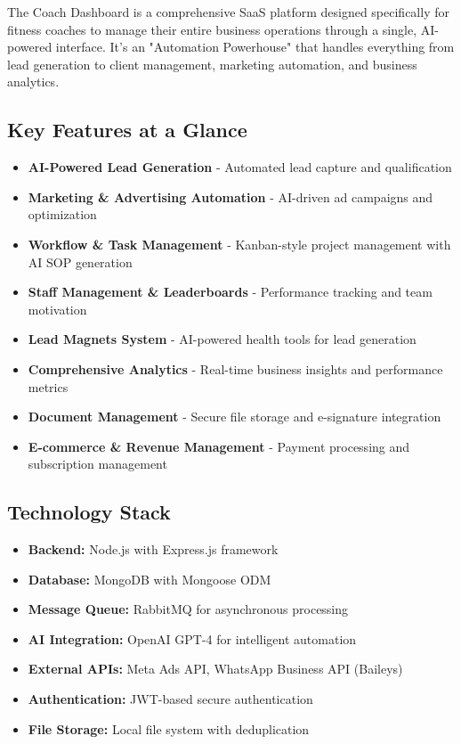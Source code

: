 \documentclass[12pt,a4paper]{article}
\begin{document}
The Coach Dashboard is a comprehensive SaaS platform designed specifically for fitness coaches to manage their entire business operations through a single, AI-powered interface. It's an "Automation Powerhouse" that handles everything from lead generation to client management, marketing automation, and business analytics.

\subsection{Key Features at a Glance}

\begin{itemize}
    \item \textbf{AI-Powered Lead Generation} - Automated lead capture and qualification
    \item \textbf{Marketing \& Advertising Automation} - AI-driven ad campaigns and optimization
    \item \textbf{Workflow \& Task Management} - Kanban-style project management with AI SOP generation
    \item \textbf{Staff Management \& Leaderboards} - Performance tracking and team motivation
    \item \textbf{Lead Magnets System} - AI-powered health tools for lead generation
    \item \textbf{Comprehensive Analytics} - Real-time business insights and performance metrics
    \item \textbf{Document Management} - Secure file storage and e-signature integration
    \item \textbf{E-commerce \& Revenue Management} - Payment processing and subscription management
\end{itemize}

\subsection{Technology Stack}

\begin{itemize}
    \item \textbf{Backend:} Node.js with Express.js framework
    \item \textbf{Database:} MongoDB with Mongoose ODM
    \item \textbf{Message Queue:} RabbitMQ for asynchronous processing
    \item \textbf{AI Integration:} OpenAI GPT-4 for intelligent automation
    \item \textbf{External APIs:} Meta Ads API, WhatsApp Business API (Baileys)
    \item \textbf{Authentication:} JWT-based secure authentication
    \item \textbf{File Storage:} Local file system with deduplication
\end{itemize}
\end{document}
